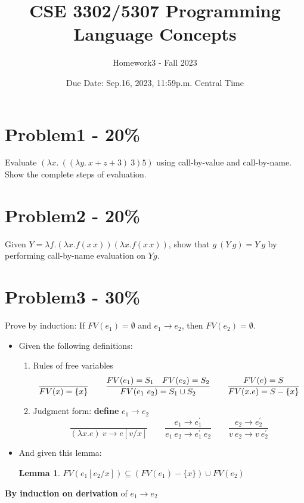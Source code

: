 \documentclass{article}
\newtheorem{lemma}[thm]{Lemma}
\newcommand{\answerbox}{
    \vspace{7cm} %
}
\begin{document}
\title{CSE 3302/5307 Programming Language Concepts}
\author{Homework3 - Fall 2023}
\date{Due Date: Sep.16, 2023, 11:59p.m. Central Time}
\maketitle
\thispagestyle{fancy}


\section*{Problem1 - 20\%}

Evaluate $(\lambda x.\ ((\lambda y.\ x+z+3 )\ 3 )5)$ using call-by-value and call-by-name. Show the complete steps of evaluation. 
\answerbox
\answerbox

\section*{Problem2 - 20\%}
Given $Y = \lambda f . (\lambda x . f (x \, x)) (\lambda x . f (x \, x))$, show that $g\:(Y\:g) = Y\:g$ by performing call-by-name evaluation on $Y g$.
\answerbox

\section*{Problem3 - 30\%}

Prove by induction: If $FV(e_{1})=\emptyset$ and $e_{1} \rightarrow e_{2}$, then $FV(e_{2})=\emptyset$.
\begin{itemize}
\item Given the following definitions:
\begin{enumerate}
    \item Rules of free variables 
    \[
    \frac{}{FV(x)=\{x\}} \qquad
    \frac{FV(e_1) = S_1\quad FV(e_2) = S_2}{FV(e_1\ e_2)=S_1\cup S_2} \qquad
    \frac{FV(e) = S}{FV(\\x.e)=S-\{x\}}
    \]
    \item Judgment form: \textbf{define} $e_1\rightarrow e_2$
    \[
    \frac{}{(\lambda x.e)\ v \rightarrow e [v/x]}
    \qquad
    \frac{e_1 \rightarrow e_1^{'}}{e_1\ e_2 \rightarrow e_1^{'}\ e_2}
    \qquad
    \frac{e_2 \rightarrow e_2^{'}}{v\ e_2 \rightarrow v\ e_2^{'}}
    \]
\end{enumerate}
\item And given this lemma:
    \begin{lemma}\label{fv}
        $FV(e_1[e_2/x]) \subseteq (FV(e_1) - \{x\}) \cup FV(e_2)$
    \end{lemma}
\end{itemize}
\vspace{20pt}
\newpage
\textbf{By induction on derivation} of $e_1\rightarrow e_2$
\end{document}
